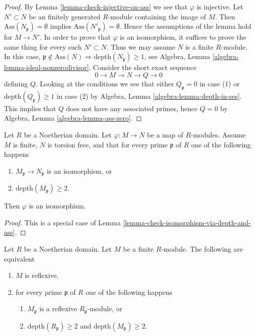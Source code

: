\begin{proof}
By Lemma \ref{lemma-check-injective-on-ass} we see that $\varphi$ is injective.
Let $N' \subset N$ be an finitely generated $R$-module containing
the image of $M$. Then $\text{Ass}(N_\mathfrak p) = \emptyset$ implies
$\text{Ass}(N'_\mathfrak p) = \emptyset$.
Hence the assumptions of the lemma hold for $M \to N'$.
In order to prove that $\varphi$ is an isomorphism, it suffices
to prove the same thing for every such $N' \subset N$. Thus we may
assume $N$ is a finite $R$-module. In this case,
$\mathfrak p \not \in \text{Ass}(N) \Rightarrow
\text{depth}(N_\mathfrak p) \geq 1$, see
Algebra, Lemma \ref{algebra-lemma-ideal-nonzerodivisor}.
Consider the short exact sequence
$$
0 \to M \to N \to Q \to 0
$$
defining $Q$.
Looking at the conditions we see that either $Q_\mathfrak p = 0$
in case (1) or $\text{depth}(Q_\mathfrak p) \geq 1$ in case (2)
by Algebra, Lemma \ref{algebra-lemma-depth-in-ses}.
This implies that $Q$ does not have any associated primes, hence $Q = 0$ by
Algebra, Lemma \ref{algebra-lemma-ass-zero}.
\end{proof}

\begin{lemma}
\label{lemma-isom-depth-2-torsion-free}
Let $R$ be a Noetherian domain. Let $\varphi : M \to N$ be a map of
$R$-modules. Assume $M$ is finite, $N$ is torsion free, and
that for every prime $\mathfrak p$ of $R$ one of the following happens
\begin{enumerate}
\item $M_\mathfrak p \to N_\mathfrak p$ is an isomorphism, or
\item $\text{depth}(M_\mathfrak p) \geq 2$.
\end{enumerate}
Then $\varphi$ is an isomorphism.
\end{lemma}

\begin{proof}
This is a special case of
Lemma \ref{lemma-check-isomorphism-via-depth-and-ass}.
\end{proof}

\begin{lemma}
\label{lemma-reflexive-depth-2}
Let $R$ be a Noetherian domain. Let $M$ be a finite $R$-module.
The following are equivalent
\begin{enumerate}
\item $M$ is reflexive,
\item for every prime $\mathfrak p$ of $R$ one of the following happens
\begin{enumerate}
\item $M_\mathfrak p$ is a reflexive $R_\mathfrak p$-module, or
\item $\text{depth}(R_\mathfrak p) \geq 2$ and
$\text{depth}(M_\mathfrak p) \geq 2$.
\end{enumerate}
\end{enumerate}
\end{lemma}

